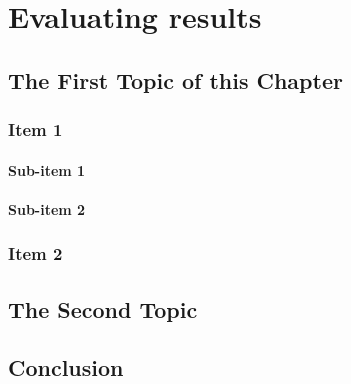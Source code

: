 \chapter{Evaluating results}
\label{cha:5}
\lipsum[79]

\section{The First Topic of this Chapter}
\subsection{Item 1}
\subsubsection{Sub-item 1}
\lipsum[80]

\subsubsection{Sub-item 2}
\lipsum[81]

\subsection{Item 2}
\lipsum[82]

\section{The Second Topic}
\lipsum[83-85]

\section{Conclusion}
\lipsum[86-88]

